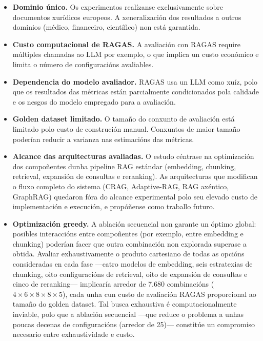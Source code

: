 \documentclass[11pt, a4paper, oneside]{report}
\begin{document}
\begin{itemize}
  \item \textbf{Dominio único.} Os experimentos realízanse exclusivamente sobre
    documentos xurídicos europeos. A xeneralización dos resultados a outros dominios
    (médico, financeiro, científico) non está garantida.
  \item \textbf{Custo computacional de RAGAS.} A avaliación con RAGAS require múltiples
    chamadas ao LLM por exemplo, o que implica un custo económico e limita o número
    de configuracións avaliables.
  \item \textbf{Dependencia do modelo avaliador.} RAGAS usa un LLM como xuíz, polo que
    os resultados das métricas están parcialmente condicionados pola calidade e os
    nesgos do modelo empregado para a avaliación.
  \item \textbf{Golden dataset limitado.} O tamaño do conxunto de avaliación está
    limitado polo custo de construción manual. Conxuntos de maior tamaño poderían
    reducir a varianza nas estimacións das métricas.
  \item \textbf{Alcance das arquitecturas avaliadas.} O estudo céntrase na optimización
    dos compoñentes dunha pipeline RAG estándar (embedding, chunking, retrieval,
    expansión de consultas e reranking). As arquitecturas que modifican o fluxo completo
    do sistema (CRAG, Adaptive-RAG, RAG axéntico, GraphRAG) quedaron fóra do alcance
    experimental polo seu elevado custo de implementación e execución, e propóñense como
    traballo futuro.
  \item \textbf{Optimización greedy.} A ablación secuencial non garante un óptimo global:
    posibles interaccións entre compoñentes (por exemplo, entre embedding e chunking)
    poderían facer que outra combinación non explorada superase a obtida. Avaliar
    exhaustivamente o produto cartesiano de todas as opcións consideradas en cada fase
    —catro modelos de embedding, seis estratexias de chunking, oito configuracións de
    retrieval, oito de expansión de consultas e cinco de reranking— implicaría arredor
    de 7.680 combinacións ($4 \times 6 \times 8 \times 8 \times 5$), cada unha cun custo
    de avaliación RAGAS proporcional ao tamaño do golden dataset. Tal busca exhaustiva é
    computacionalmente inviable, polo que a ablación secuencial —que reduce o problema a
    unhas poucas decenas de configuracións (arredor de 25)— constitúe un compromiso
    necesario entre exhaustividade e custo.
\end{itemize}
\end{document}
